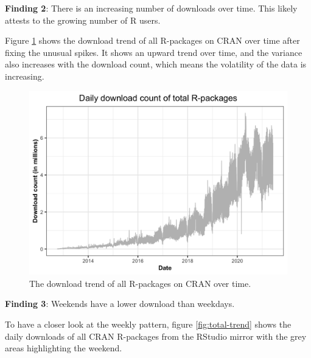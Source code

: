 \documentclass[
]{book}
\newenvironment{discovery}[1]{%
  \begin{tcolorbox}[colback=blue!30,colframe=blue!80!black]#1}{\end{tcolorbox}}
\begin{document}
\begin{discovery}
\textbf{Finding 2}: There is an increasing number of downloads over
time. This likely attests to the growing number of R users.
\end{discovery}

Figure \ref{fig:download-over-time} shows the download trend of all R-packages on CRAN over time after fixing the unusual spikes. It shows an upward trend over time, and the variance also increases with the download count, which means the volatility of the data is increasing.



\begin{figure}

{\centering \includegraphics{figures/download-over-time-1} 

}

\caption{The download trend of all R-packages on CRAN over time.}\label{fig:download-over-time}
\end{figure}

\begin{discovery}
\textbf{Finding 3}: Weekends have a lower download than weekdays.
\end{discovery}

To have a closer look at the weekly pattern, figure \ref{fig:total-trend} shows the daily downloads of all CRAN R-packages from the RStudio mirror with the grey areas highlighting the weekend.
\end{document}
